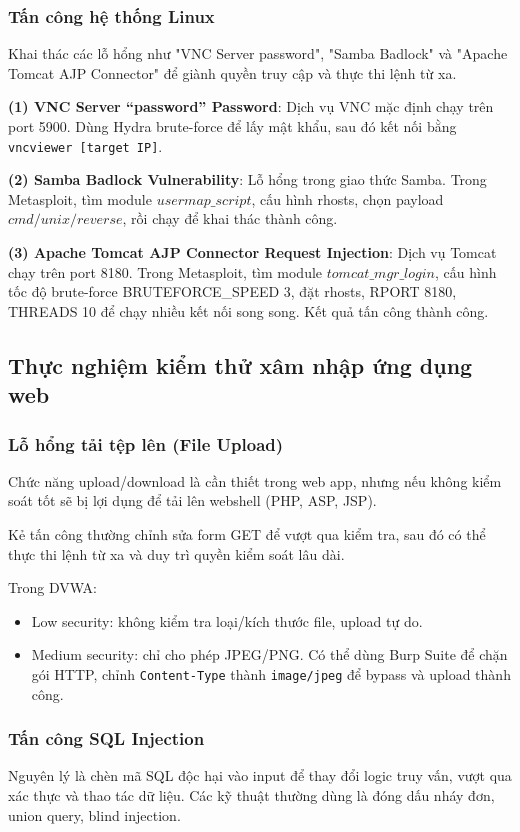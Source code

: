 \documentclass[conference]{IEEEtran}
\begin{document}
\subsubsection{Tấn công hệ thống Linux} 
Khai thác các lỗ hổng như "VNC Server password", "Samba Badlock" và "Apache Tomcat AJP Connector" để giành quyền truy cập và thực thi lệnh từ xa.

\textbf{(1) VNC Server “password” Password}: Dịch vụ VNC mặc định chạy trên port 5900. Dùng Hydra brute-force để lấy mật khẩu, sau đó kết nối bằng \texttt{vncviewer [target IP]}.

\textbf{(2) Samba Badlock Vulnerability}: Lỗ hổng trong giao thức Samba. Trong Metasploit, tìm module $usermap\_script$, cấu hình rhosts, chọn payload $cmd/unix/reverse$, rồi chạy để khai thác thành công.

\textbf{(3) Apache Tomcat AJP Connector Request Injection}: Dịch vụ Tomcat chạy trên port 8180. Trong Metasploit, tìm module $tomcat\_mgr\_login$, cấu hình tốc độ brute-force BRUTEFORCE\_SPEED 3, đặt rhosts, RPORT 8180, THREADS 10 để chạy nhiều kết nối song song. Kết quả tấn công thành công.

\subsection{Thực nghiệm kiểm thử xâm nhập ứng dụng web}
\subsubsection{Lỗ hổng tải tệp lên (File Upload)} Chức năng upload/download là cần thiết trong web app, nhưng nếu không kiểm soát tốt sẽ bị lợi dụng để tải lên webshell (PHP, ASP, JSP).

Kẻ tấn công thường chỉnh sửa form GET để vượt qua kiểm tra, sau đó có thể thực thi lệnh từ xa và duy trì quyền kiểm soát lâu dài.

Trong DVWA:
\begin{itemize}
    \item Low security: không kiểm tra loại/kích thước file, upload tự do.
    \item Medium security: chỉ cho phép JPEG/PNG. Có thể dùng Burp Suite để chặn gói HTTP, chỉnh \texttt{Content-Type} thành \texttt{image/jpeg} để bypass và upload thành công.
\end{itemize}

\subsubsection{Tấn công SQL Injection} 
Nguyên lý là chèn mã SQL độc hại vào input để thay đổi logic truy vấn, vượt qua xác thực và thao tác dữ liệu.
Các kỹ thuật thường dùng là đóng dấu nháy đơn, union query, blind injection.
\end{document}
